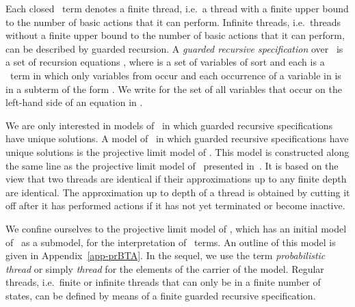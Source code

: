 \documentclass{llncs}
\begin{document}
Each closed \prBTA\ term denotes a finite thread, i.e.\ a thread with a
finite upper bound to the number of basic actions that it can perform.
Infinite threads, i.e.\ threads without a finite upper bound to the
number of basic actions that it can perform, can be described by guarded 
recursion.
A \emph{guarded recursive specification} over \prBTA\ is a set of 
recursion equations , where  is a 
set of variables of sort  and each  is a \prBTA\ term in which 
only variables from  occur and each occurrence of a variable in  
is in a subterm of the form .
We write  for the set of all variables that occur on the
left-hand side of an equation in .

We are only interested in models of \prBTA\ in which guarded recursive
specifications have unique solutions.
A model of \prBTA\ in which guarded recursive specifications have unique 
solutions is the projective limit model of \prBTA.
This model is constructed along the same line as the projective limit 
model of \BTA\ presented in~\cite{BM12b}.
It is based on the view that two threads are identical if their 
approximations up to any finite depth are identical. 
The approximation up to depth  of a thread is obtained by cutting it 
off after it has performed  actions if it has not yet terminated or
become inactive.

We confine ourselves to the projective limit model of \prBTA, which has 
an initial model of \prBTA\ as a submodel, for the interpretation of 
\prBTA\ terms. 
An outline of this model is given in Appendix~\ref{app-prBTA}.
In the sequel, we use the term \emph{probabilistic thread} or simply 
\emph{thread} for the elements of the carrier of the model.
Regular threads, i.e.\ finite or infinite threads that can only be in a 
finite number of states, can be defined by means of a finite guarded 
recursive specification.
\end{document}
